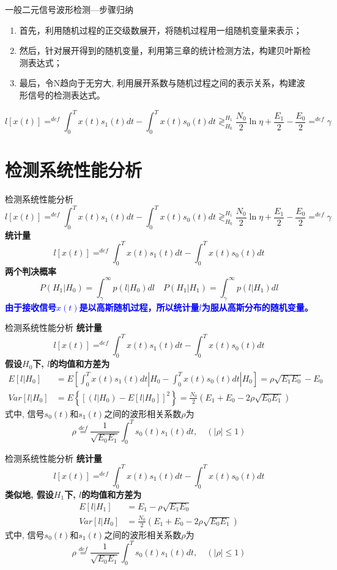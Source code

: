 \begin{frame}{一般二元信号波形检测---步骤归纳}
\begin{enumerate}
	\setlength{\itemsep}{.5cm}
	\item 首先，利用随机过程的正交级数展开，将随机过程用一组随机变量来表示；
	\item 然后，针对展开得到的随机变量，利用第三章的统计检测方法，构建贝叶斯检测表达式；
	\item 最后，令N趋向于无穷大, 利用展开系数与随机过程之间的表示关系，构建波形信号的检测表达式。
\end{enumerate}
\[l[x(t)]\mathop{=}^{def}\int_{0}^{T}x(t)s_1(t)dt-\int_{0}^{T}x(t)s_0(t)dt\mathop{\gtrless}_{H_0}^{H_1}\frac{N_0}{2}\ln\eta+\frac{E_1}{2}-\frac{E_0}{2}\mathop{=}^{def}\gamma \]
\end{frame}

\section{检测系统性能分析}

\begin{frame}{检测系统性能分析}
\[l[x(t)]\mathop{=}^{def}\int_{0}^{T}x(t)s_1(t)dt-\int_{0}^{T}x(t)s_0(t)dt\mathop{\gtrless}_{H_0}^{H_1}\frac{N_0}{2}\ln\eta+\frac{E_1}{2}-\frac{E_0}{2}\mathop{=}^{def}\gamma \]
\textbf{统计量}
\[l[x(t)]\mathop{=}^{def}\int_{0}^{T}x(t)s_1(t)dt-\int_{0}^{T}x(t)s_0(t)dt\]
\textbf{两个判决概率}
\[P(H_1|H_0)=\int_{\gamma}^{\infty}p(l|H_0)dl\quad P(H_1|H_1)=\int_{\gamma}^{\infty}p(l|H_1)dl \]
\textbf{\textcolor{blue}{由于接收信号$x(t)$是以高斯随机过程，所以统计量$l$为服从高斯分布的随机变量。}}
\end{frame}

\begin{frame}{检测系统性能分析}
\textbf{统计量}
\[l[x(t)]\mathop{=}^{def}\int_{0}^{T}x(t)s_1(t)dt-\int_{0}^{T}x(t)s_0(t)dt\]
\textbf{假设$H_0$下, $l$的均值和方差为}
\begin{align*}
E[l|H_0]&=E\left[\int_{0}^{T}x(t)s_1(t)dt|H_0-\int_{0}^{T}x(t)s_0(t)dt|H_0\right]=\rho\sqrt{E_1E_0}-E_0\\
Var[l|H_0]&=E\left\{\left[(l|H_0)-E[l|H_0]\right]^2\right\}=\frac{N_0}{2}(E_1+E_0-2\rho\sqrt{E_0E_1})
\end{align*}
式中, 信号$s_0(t)$和$s_1(t)$之间的波形相关系数$\rho$为 \[\rho\mathop{=}\limits^{def}\frac{1}{\sqrt{E_{0}E_{1}}}\int_{0}^{T}s_0(t)s_1(t)dt,\quad(|\rho|\le 1)\]
\end{frame}

\begin{frame}{检测系统性能分析}
\textbf{统计量}
\[l[x(t)]\mathop{=}^{def}\int_{0}^{T}x(t)s_1(t)dt-\int_{0}^{T}x(t)s_0(t)dt\]
\textbf{类似地, 假设$H_1$下, $l$的均值和方差为}
\begin{align*}
E[l|H_1]&=E_1-\rho\sqrt{E_1E_0}\\
Var[l|H_0]&=\frac{N_0}{2}(E_1+E_0-2\rho\sqrt{E_0E_1})
\end{align*}
式中, 信号$s_0(t)$和$s_1(t)$之间的波形相关系数$\rho$为 \[\rho\mathop{=}\limits^{def}\frac{1}{\sqrt{E_{0}E_{1}}}\int_{0}^{T}s_0(t)s_1(t)dt,\quad(|\rho|\le 1)\]
\end{frame}

